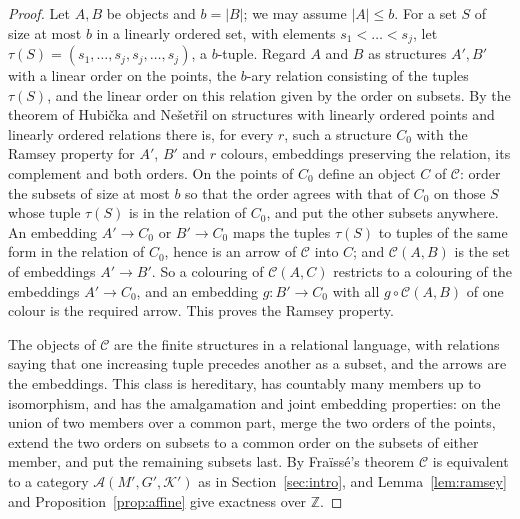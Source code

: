 \documentclass[11pt,a4paper]{article}
\theoremstyle{definition}
\newcommand{\A}{\mathcal{A}}
\newcommand{\K}{\mathcal{K}}
\newcommand{\C}{\mathcal{C}}
\newcommand{\Z}{\mathbb{Z}}
\begin{document}
\begin{proof}
Let $A,B$ be objects and $b=|B|$; we may assume $|A|\le b$. For a set $S$
of size at most $b$ in a linearly ordered set, with elements
$s_1<\dots<s_j$, let $\tau(S)=(s_1,\dots,s_j,s_j,\dots,s_j)$, a $b$-tuple.
Regard $A$ and $B$ as structures $A',B'$ with a linear order on the points,
the $b$-ary relation consisting of the tuples $\tau(S)$, and the linear
order on this relation given by the order on subsets. By the theorem of
Hubi\v cka and Ne\v set\v ril on structures with linearly ordered points and
linearly ordered relations \cite[Theorem~4.46]{HN} there is, for every $r$,
such a structure $C_0$ with the Ramsey property for $A'$, $B'$ and $r$
colours, embeddings preserving the relation, its complement and both
orders. On the points of $C_0$ define an object $C$ of $\C$: order the
subsets of size at most $b$ so that the order agrees with that of $C_0$ on
those $S$ whose tuple $\tau(S)$ is in the relation of $C_0$, and put the
other subsets anywhere. An embedding $A'\to C_0$ or $B'\to C_0$ maps the
tuples $\tau(S)$ to tuples of the same form in the relation of $C_0$, hence
is an arrow of $\C$ into $C$; and $\C(A,B)$ is the set of embeddings
$A'\to B'$. So a colouring of $\C(A,C)$ restricts to a colouring of the
embeddings $A'\to C_0$, and an embedding $g\colon B'\to C_0$ with all
$g\circ\C(A,B)$ of one colour is the required arrow. This proves the Ramsey
property.

The objects of $\C$ are the finite structures in a relational language,
with relations saying that one increasing tuple precedes another as a
subset, and the arrows are the embeddings. This class is hereditary, has
countably many members up to isomorphism, and has the amalgamation and
joint embedding properties: on the union of two members over a common part,
merge the two orders of the points, extend the two orders on subsets to a
common order on the subsets of either member, and put the remaining
subsets last. By Fra\"iss\'e's theorem $\C$ is equivalent to a category
$\A(M',G',\K')$ as in Section~\ref{sec:intro}, and
Lemma~\ref{lem:ramsey} and Proposition~\ref{prop:affine} give exactness
over $\Z$.
\end{proof}
\end{document}

